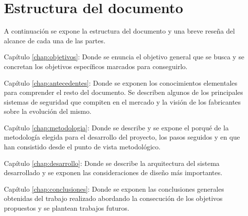 \section{Estructura del documento}

A continuación se expone la estructura del documento y una breve reseña del alcance de cada una de las partes.
\begin{definitionlist}

\item[Capítulo \ref{chap:objetivos}: \nameref{chap:objetivos}] Donde se enuncia el objetivo general que se busca y se concretan los objetivos específicos marcados para conseguirlo.
\item[Capítulo \ref{chap:antecedentes}: \nameref{chap:antecedentes}] Donde se exponen los conocimientos elementales para comprender el resto del documento. Se describen algunos de los principales sistemas de seguridad que compiten en el mercado y la visión de los fabricantes sobre la evolución del mismo.
\item[Capítulo \ref{chap:metodologia}: \nameref{chap:metodologia}] Donde se describe y se expone el porqué de la metodología elegida para el desarrollo del proyecto, los pasos seguidos y en que han consistido desde el punto de vista metodológico.
\item[Capítulo \ref{chap:desarrollo}: \nameref{chap:desarrollo}] Donde se describe la arquitectura del sistema desarrollado y se exponen las consideraciones de diseño más importantes.
\item[Capítulo \ref{chap:conclusiones}: \nameref{chap:conclusiones}] Donde se exponen las conclusiones generales obtenidas del trabajo realizado abordando la consecución de los objetivos propuestos y se plantean trabajos futuros.
\end{definitionlist}
